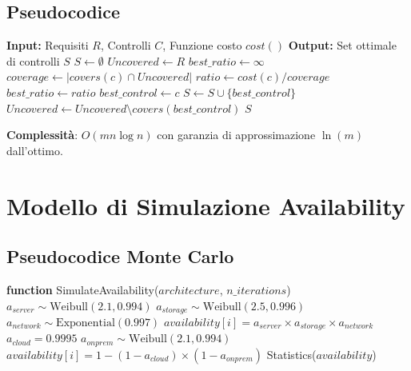 \subsection{\texorpdfstring{Pseudocodice}{B.1.1 - Pseudocodice}}

\begin{algorithmic}[1]
\State \textbf{Input:} Requisiti $R$, Controlli $C$, Funzione costo $cost()$
\State \textbf{Output:} Set ottimale di controlli $S$
\State
\State $S \leftarrow \emptyset$
\State $Uncovered \leftarrow R$
    \State $best\_ratio \leftarrow \infty$
        \State $coverage \leftarrow |covers(c) \cap Uncovered|$
        \State $ratio \leftarrow cost(c) / coverage$
            \State $best\_ratio \leftarrow ratio$
            \State $best\_control \leftarrow c$
        \EndIf
    \EndFor
    \State $S \leftarrow S \cup \{best\_control\}$
    \State $Uncovered \leftarrow Uncovered \setminus covers(best\_control)$
\EndWhile
\State \Return $S$
\end{algorithmic}

\textbf{Complessità}: $O(mn \log n)$ con garanzia di approssimazione $\ln(m)$ dall'ottimo.

\section{\texorpdfstring{Modello di Simulazione Availability}{B.2 - Modello di Simulazione Availability}}

\subsection{\texorpdfstring{Pseudocodice Monte Carlo}{B.2.1 - Pseudocodice Monte Carlo}}

\begin{algorithmic}[1]
\State \textbf{function} SimulateAvailability($architecture$, $n\_iterations$)
        \State $a_{server} \sim \text{Weibull}(2.1, 0.994)$
        \State $a_{storage} \sim \text{Weibull}(2.5, 0.996)$
        \State $a_{network} \sim \text{Exponential}(0.997)$
        \State $availability[i] = a_{server} \times a_{storage} \times a_{network}$
        \State $a_{cloud} = 0.9995$ 
        \State $a_{onprem} \sim \text{Weibull}(2.1, 0.994)$
        \State $availability[i] = 1 - (1 - a_{cloud}) \times (1 - a_{onprem})$
    \EndIf
\EndFor
\State \Return Statistics($availability$)
\end{algorithmic}

